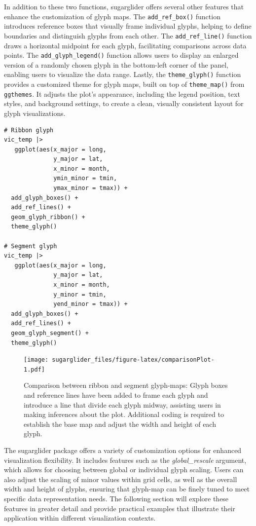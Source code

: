 In addition to these two functions, sugarglider offers several other features that enhance the customization of glyph maps. The \texttt{add\_ref\_box()} function introduces reference boxes that visually frame individual glyphs, helping to define boundaries and distinguish glyphs from each other. The \texttt{add\_ref\_line()} function draws a horizontal midpoint for each glyph, facilitating comparisons across data points. The \texttt{add\_glyph\_legend()} function allows users to display an enlarged version of a randomly chosen glyph in the bottom-left corner of the panel, enabling users to visualize the data range. Lastly, the \texttt{theme\_glyph()} function provides a customized theme for glyph maps, built on top of \texttt{theme\_map()} from \texttt{ggthemes}. It adjusts the plot's appearance, including the legend position, text styles, and background settings, to create a clean, visually consistent layout for glyph visualizations.

\begin{verbatim}
# Ribbon glyph
vic_temp |>
   ggplot(aes(x_major = long,
              y_major = lat,
              x_minor = month,
              ymin_minor = tmin,
              ymax_minor = tmax)) +
  add_glyph_boxes() +
  add_ref_lines() +
  geom_glyph_ribbon() +
  theme_glyph()

# Segment glyph
vic_temp |>
   ggplot(aes(x_major = long,
              y_major = lat,
              x_minor = month,
              y_minor = tmin,
              yend_minor = tmax)) +
  add_glyph_boxes() +
  add_ref_lines() +
  geom_glyph_segment() +
  theme_glyph()
\end{verbatim}

\begin{figure}
\centering
\texttt{[image: sugarglider\_files/figure-latex/comparisonPlot-1.pdf]}
\caption{\label{fig:comparisonPlot}Comparison between ribbon and segment glyph-maps: Glyph boxes and reference lines have been added to frame each glyph and introduce a line that divide each glyph midway, assisting users in making inferences about the plot. Additional coding is required to establish the base map and adjust the width and height of each glyph.}
\end{figure}

The sugarglider package offers a variety of customization options for enhanced visualization flexibility. It includes features such as the \emph{global\_rescale} argument, which allows for choosing between global or individual glyph scaling. Users can also adjust the scaling of minor values within grid cells, as well as the overall width and height of glyphs, ensuring that glyph-map can be finely tuned to meet specific data representation needs. The following section will explore these features in greater detail and provide practical examples that illustrate their application within different visualization contexts.

